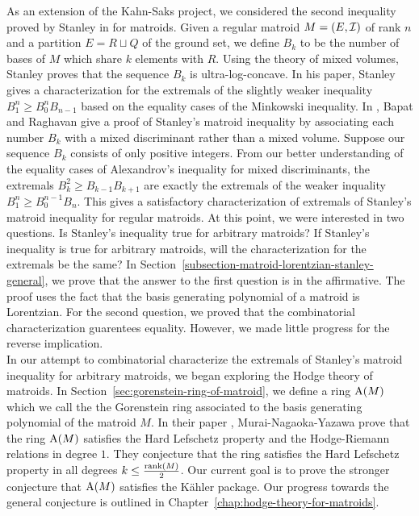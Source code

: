 \documentclass{puthesis-UG}
\begin{document}
As an extension of the Kahn-Saks project, we considered the second inequality proved by Stanley in \cite{STANLEY} for matroids. Given a regular matroid $M = (E, \mathcal{I})$ of rank $n$ and a partition $E = R \sqcup Q$ of the ground set, we define $B_k$ to be the number of bases of $M$ which share $k$ elements with $R$. Using the theory of mixed volumes, Stanley proves that the sequence $B_k$ is ultra-log-concave. In his paper, Stanley gives a characterization for the extremals of the slightly weaker inequality $B_1^n \geq B_0^{n} B_{n-1}$ based on the equality cases of the Minkowski inequality. In \cite{bapat_raghavan_1997}, Bapat and Raghavan give a proof of Stanley's matroid inequality by associating each number $B_k$ with a mixed discriminant rather than a mixed volume. Suppose our sequence $B_k$ consists of only positive integers. From our better understanding of the equality cases of Alexandrov's inequality for mixed discriminants, the extremals $B_k^2 \geq B_{k-1} B_{k+1}$ are exactly the extremals of the weaker inquality $B_{1}^n \geq B_0^{n-1} B_n$. This gives a satisfactory characterization of extremals of Stanley's matroid inequality for regular matroids. At this point, we were interested in two questions. Is Stanley's inequality true for arbitrary matroids? If Stanley's inequality is true for arbitrary matroids, will the characterization for the extremals be the same? In Section~\ref{subsection-matroid-lorentzian-stanley-general}, we prove that the answer to the first question is in the affirmative. The proof uses the fact that the basis generating polynomial of a matroid is Lorentzian. For the second question, we proved that the combinatorial characterization guarentees equality. However, we made little progress for the reverse implication. \\

In our attempt to combinatorial characterize the extremals of Stanley's matroid inequality for arbitrary matroids, we began exploring the Hodge theory of matroids. In Section~\ref{sec:gorenstein-ring-of-matroid}, we define a ring $\operatorname{A}(M)$ which we call the the Gorenstein ring associated to the basis generating polynomial of the matroid $M$. In their paper \cite{MNY}, Murai-Nagaoka-Yazawa prove that the ring $\operatorname{A}(M)$ satisfies the Hard Lefschetz property and the Hodge-Riemann relations in degree $1$. They conjecture that the ring satisfies the Hard Lefschetz property in all degrees $k \leq \frac{\operatorname{rank} (M)}{2}$. Our current goal is to prove the stronger conjecture that $\operatorname{A}(M)$ satisfies the K\"ahler package. Our progress towards the general conjecture is outlined in Chapter~\ref{chap:hodge-theory-for-matroids}. 
\end{document}

